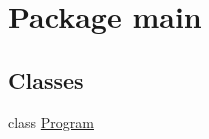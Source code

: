 \hypertarget{namespacemain}{}\section{Package main}
\label{namespacemain}
\subsection*{Classes}
\begin{DoxyCompactItemize}
\item 
class \hyperlink{classmain_1_1_program}{Program}
\end{DoxyCompactItemize}
